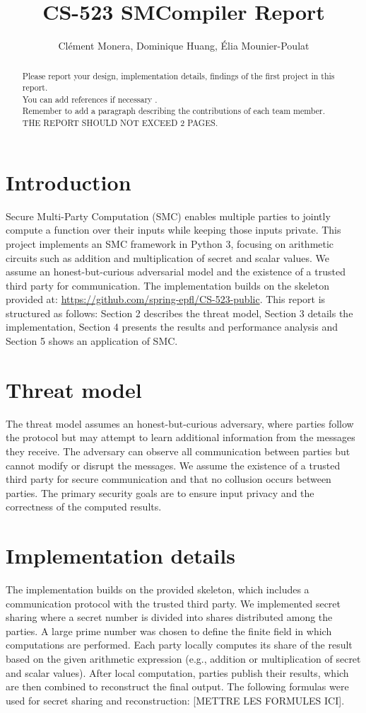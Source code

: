 \documentclass[10pt,conference,compsocconf]{IEEEtran}
\title{CS-523 SMCompiler Report}
\author{Clément Monera, Dominique Huang, Élia Mounier-Poulat}
\date{}
\begin{document}
\maketitle

\begin{abstract}
    Please report your design, implementation details, findings of the first project in this report. \\
    You can add references if necessary \cite{article}. \\
    Remember to add a paragraph describing the contributions of each team member.\\
    THE REPORT SHOULD NOT EXCEED 2 PAGES.
\end{abstract}

\section{Introduction}
Secure Multi-Party Computation (SMC) enables multiple parties to jointly compute a function over their inputs while keeping those inputs private. This project implements an SMC framework in Python 3, focusing on arithmetic circuits such as addition and multiplication of secret and scalar values. We assume an honest-but-curious adversarial model and the existence of a trusted third party for communication. The implementation builds on the skeleton provided at: \url{https://github.com/spring-epfl/CS-523-public}. This report is structured as follows: Section 2 describes the threat model, Section 3 details the implementation, Section 4 presents the results and performance analysis and Section 5 shows an application of SMC.

\section{Threat model}
The threat model assumes an honest-but-curious adversary, where parties follow the protocol but may attempt to learn additional information from the messages they receive. The adversary can observe all communication between parties but cannot modify or disrupt the messages. We assume the existence of a trusted third party for secure communication and that no collusion occurs between parties. The primary security goals are to ensure input privacy and the correctness of the computed results.

\section{Implementation details}
The implementation builds on the provided skeleton, which includes a communication protocol with the trusted third party. We implemented secret sharing where a secret number is divided into shares distributed among the parties. A large prime number was chosen to define the finite field in which computations are performed. Each party locally computes its share of the result based on the given arithmetic expression (e.g., addition or multiplication of secret and scalar values). After local computation, parties publish their results, which are then combined to reconstruct the final output. The following formulas were used for secret sharing and reconstruction: [METTRE LES FORMULES ICI].
\end{document}
